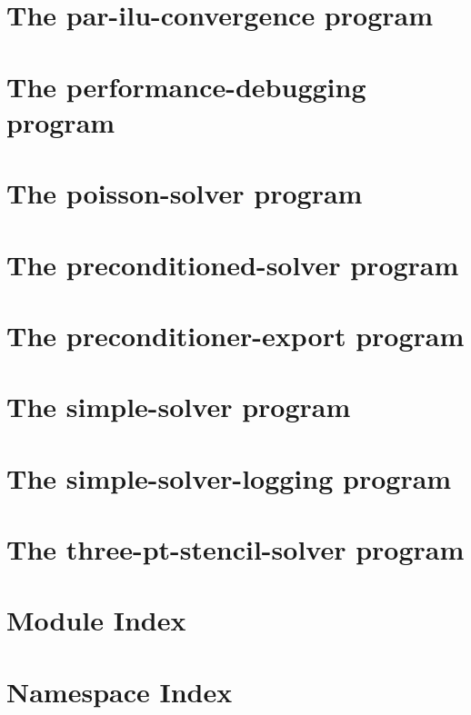 \let\mypdfximage\pdfximage\def\pdfximage{\immediate\mypdfximage}\documentclass[twoside]{book}
\newcommand{\+}{\discretionary{\mbox{\scriptsize$\hookleftarrow$}}{}{}}
\begin{document}
\chapter{The par-\/ilu-\/convergence program}
\label{par_ilu_convergence}

\chapter{The performance-\/debugging program}
\label{performance_debugging}

\chapter{The poisson-\/solver program}
\label{poisson_solver}

\chapter{The preconditioned-\/solver program}
\label{preconditioned_solver}

\chapter{The preconditioner-\/export program}
\label{preconditioner_export}

\chapter{The simple-\/solver program}
\label{simple_solver}

\chapter{The simple-\/solver-\/logging program}
\label{simple_solver_logging}

\chapter{The three-\/pt-\/stencil-\/solver program}
\label{three_pt_stencil_solver}

\chapter{Module Index}

\chapter{Namespace Index}

\end{document}
